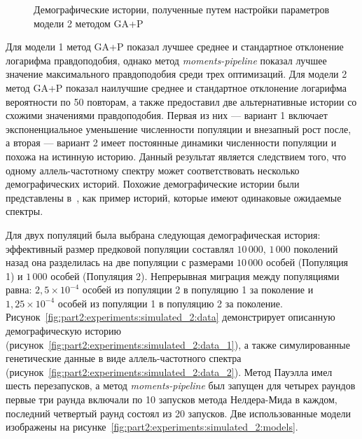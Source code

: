 \begin{figure}[ht]
\begin{subfigure}[b]{.33\textwidth}
    \caption{}
    \label{fig:part2:experiments:simulated_1:results_model_2_2}
    \end{subfigure}
    \caption{Демографические истории, полученные путем настройки параметров модели 2 методом GA+P}
    \label{fig:part2:experiments:simulated_1:results_model_2}
\end{figure}

Для модели 1 метод GA+P показал лучшее среднее и стандартное отклонение логарифма правдоподобия, однако метод \textit{moments-pipeline} показал лучшее значение максимального правдоподобия среди трех оптимизаций.
Для модели 2 метод GA+P показал наилучшие среднее и стандартное отклонение логарифма вероятности по 50 повторам, а также предоставил две альтернативные истории со схожими значениями правдоподобия.
Первая из них --- вариант 1 включает экспоненциальное уменьшение численности популяции и внезапный рост после, а вторая --- вариант 2 имеет постоянные динамики численности популяции и похожа на истинную историю.
Данный результат является следствием того, что одному аллель-частотному спектру может соответствовать несколько демографических историй.
Похожие демографические истории были представлены в~\cite{myers2008can}, как пример историй, которые имеют одинаковые ожидаемые спектры. 



Для двух популяций была выбрана следующая демографическая история: эффективный размер предковой популяции составлял $10{\,}000$, $1{\,}000$ поколений назад она разделилась на две популяции с размерами $10{\,}000$ особей (Популяция 1) и $1{\,}000$ особей (Популяция 2).
Непрерывная миграция между популяциями равна: $2{,}5 \times 10^{-4}$ особей из популяции 2 в популяцию 1 за поколение и $1{,}25 \times 10^{-4}$ особей из популяции 1 в популяцию 2 за поколение.
Рисунок~\ref{fig:part2:experiments:simulated_2:data} демонстрирует описанную демографическую историю (рисунок~\ref{fig:part2:experiments:simulated_2:data_1}), а также симулированные генетические данные в виде аллель-частотного спектра (рисунок~\ref{fig:part2:experiments:simulated_2:data_2}).
Метод Пауэлла имел шесть перезапусков, а метод \textit{moments-pipeline} был запущен для четырех раундов первые три раунда включали по 10 запусков метода Нелдера-Мида в каждом, последний четвертый раунд состоял из 20 запусков.
Две использованные модели изображены на рисунке~\ref{fig:part2:experiments:simulated_2:models}.

